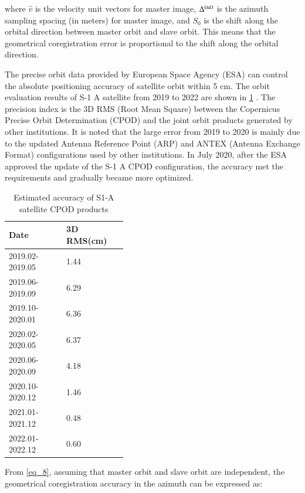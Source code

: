 \documentclass[preprint, authoryear]{elsarticle}
\begin{document}
\noindent where $\hat{v}$ is the velocity unit vectors for master image, $\Delta^{({\rm az})}$ is the azimuth sampling spacing (in meters) for master image, and $S_0$ is the shift along the orbital direction between master orbit and slave orbit. This means that the geometrical coregistration error is proportional to the shift along the orbital direction. \par
The precise orbit data provided by European Space Agency (ESA) can control the absolute positioning accuracy of satellite orbit within 5 cm. The orbit evaluation results of S-1 A satellite from 2019 to 2022 are shown in \ref{table_2} \cite{copernicus_review_2015.10-2019.09, copernicus_review_2019.10-2020.01, copernicus_review_2020.02-2020.05, copernicus_review_2020.06-2020.09, copernicus_review_2020.10-2020.12, copernicus_review_2021.01-2021.12, copernicus_review_2022.01-2022.12}. The precision index is the 3D RMS (Root Mean Square) between the Copernicus Precise Orbit Determination (CPOD) and the joint orbit products generated by other institutions. It is noted that the large error from 2019 to 2020 is mainly due to the updated Antenna Reference Point (ARP) and ANTEX (Antenna Exchange Format) configurations used by other institutions. In July 2020, after the ESA approved the update of the S-1 A CPOD configuration, the accuracy met the requirements and gradually became more optimized. \par

\begin{table}[htbp]
\centering
\caption{Estimated accuracy of S1-A satellite CPOD products}
\label{table_2}
\footnotesize
{}
\begin{tabular}{p{0.25\linewidth}p{0.15\linewidth}}
\toprule
Date & 3D RMS(cm) \\ %
\midrule
2019.02-2019.05 & 1.44 \\
2019.06-2019.09 & 6.29 \\
2019.10-2020.01 & 6.36 \\
2020.02-2020.05 & 6.37 \\
2020.06-2020.09 & 4.18 \\
2020.10-2020.12 & 1.46 \\
2021.01-2021.12 & 0.48 \\
2022.01-2022.12 & 0.60 \\
\bottomrule
\end{tabular}
\end{table}

From \ref{eq_8}, assuming that master orbit and slave orbit are independent, the geometrical coregistration accuracy in the azimuth can be expressed as: \par
\end{document}
